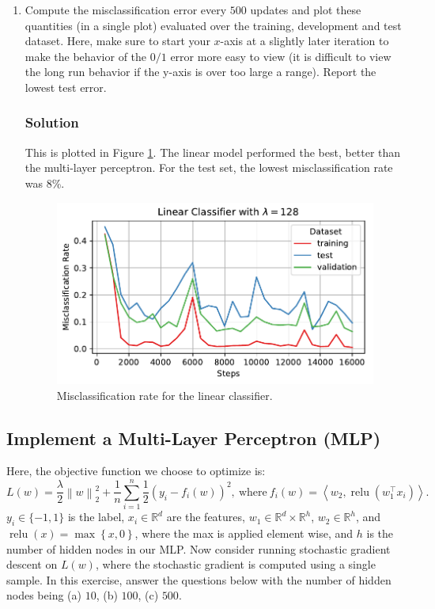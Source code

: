 \documentclass[letterpaper,11pt]{article}
\begin{document}
\begin{enumerate}
\item Compute the misclassification error every $500$ updates and plot these
  quantities (in a single plot) evaluated over the training, development and
  test dataset. Here, make sure to start your $x$-axis at a slightly later
  iteration to make the behavior of the $0/1$ error more easy to view (it is
  difficult to view the long run behavior if the y-axis is over too large a
  range). Report the lowest test error.

  \subsubsection*{Solution}

  This is plotted in Figure \ref{fig:linear_misclassification}. The linear model
  performed the best, better than the multi-layer perceptron. For the test set,
  the lowest misclassification rate was 8\%.

  \begin{figure}
    \centering
    \includegraphics{problem6/linear_misclassification.pdf}
    \caption{Misclassification rate for the linear classifier.}
    \label{fig:linear_misclassification}
  \end{figure}
\end{enumerate}

\subsection*{Implement a Multi-Layer Perceptron (MLP)}

Here, the objective function we choose to optimize is:
\begin{equation}
  L(w) = \frac{\lambda}{2}\left\lVert w \right\rVert_2^2  + \frac{1}{n}\sum_{i=1}^n\frac{1}{2}\left(y_i - f_i(w)\right)^2,~\text{where}~
  f_i(w) = \left\langle w_2, \operatorname{relu}\left(w_1^\intercal x_i\right)\right\rangle.
\end{equation}
$y_i \in \{-1, 1\}$ is the label, $x_i \in \mathbb{R}^d$ are the features,
$w_1 \in \mathbb{R}^d \times \mathbb{R}^h$, $w_2 \in \mathbb{R}^h$, and
$\operatorname{relu}(x) = \max\left\{x, 0\right\}$, where the max is applied
element wise, and $h$ is the number of hidden nodes in our MLP.  Now consider
running stochastic gradient descent on $L(w)$, where the stochastic gradient is
computed using a single sample. In this exercise, answer the questions below
with the number of hidden nodes being (a) $10$, (b) $100$, (c) $500$.
\end{document}
